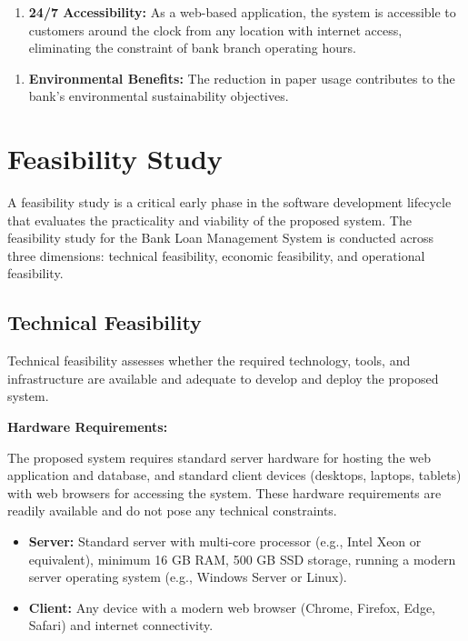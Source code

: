 \begin{enumerate}
  \item \textbf{24/7 Accessibility:} As a web-based application, the system is accessible to customers around the clock from any location with internet access, eliminating the constraint of bank branch operating hours.
\end{enumerate}

\begin{enumerate}
  \item \textbf{Environmental Benefits:} The reduction in paper usage contributes to the bank's environmental sustainability objectives.
\end{enumerate}

\section{Feasibility Study}

A feasibility study is a critical early phase in the software development lifecycle that evaluates the practicality and viability of the proposed system. The feasibility study for the Bank Loan Management System is conducted across three dimensions: technical feasibility, economic feasibility, and operational feasibility.

\subsection{Technical Feasibility}

Technical feasibility assesses whether the required technology, tools, and infrastructure are available and adequate to develop and deploy the proposed system.

\textbf{Hardware Requirements:}

The proposed system requires standard server hardware for hosting the web application and database, and standard client devices (desktops, laptops, tablets) with web browsers for accessing the system. These hardware requirements are readily available and do not pose any technical constraints.

\begin{itemize}
  \item \textbf{Server:} Standard server with multi-core processor (e.g., Intel Xeon or equivalent), minimum 16 GB RAM, 500 GB SSD storage, running a modern server operating system (e.g., Windows Server or Linux).
  \item \textbf{Client:} Any device with a modern web browser (Chrome, Firefox, Edge, Safari) and internet connectivity.
\end{itemize}

